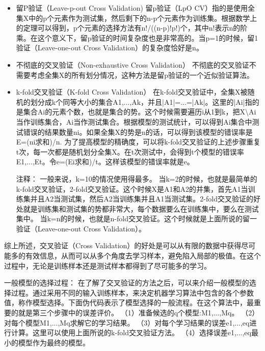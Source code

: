 \documentclass[10pt,a4paper]{ctexbook}
\begin{document}
\begin{itemize}
\item 留P验证（Leave-p-out Cross Validation)
留p验证（LpO CV）指的是使用全集X中的p个元素作为测试集，然后剩下的n-p个元素作为训练集。根据数学上的定理可以得到，p个元素的选择方法有n!/((n-p)!p!)个，其中n!表示n的阶乘。在这个意义下，留p验证的时间复杂度也是非常高的。当p=1的时候，留1验证（Leave-one-out Cross Validation）的复杂度恰好是n。

\item 不彻底的交叉验证（Non-exhaustive Cross Validation）
不彻底的交叉验证不需要考虑全集X的所有划分情况，这种方法是留p验证的一个近似验证算法。

\item k-fold交叉验证（K-fold Cross Validation）
在k-fold交叉验证中，全集X被随机的划分成k个同等大小的集合A1,...,Ak，并且|A1|=...=|Ak|。这里的|Ai|指的是集合Ai的元素个数，也就是集合的势。这个时候需要遍历i从1到k，把X\textbackslash{Ai}当作训练集合，Ai当作测试集合。根据模型的测试统计，可以得到Ai集合中测试错误的结果数量ni。如果全集X的势是n的话，可以得到该模型的错误率是E=(ni求和)/n.
为了提高模型的精确度，可以将k-fold交叉验证的上述步骤重复t次，每一次都是随机划分全集X。在t次测试中，会得到t个模型的错误率E1,...,Et。令e=(Ei求和)/t。这样该模型的错误率就是e。

注释：
一般来说，k=10的情况使用得最多。
当k=2的时候，也就是最简单的k-fold交叉验证，2-fold交叉验证。这个时候X是A1和A2的并集，首先A1当训练集并且A2当测试集，然后A2当训练集并且A1当测试集。2-fold交叉验证的好处就是训练集和测试集的势都非常大，每个数据要么在训练集中，要么在测试集中。
当k=n的时候，也就是n-fold交叉验证。这个时候就是上面所说的留一验证（Leave-one-out Cross Validation）。
\end{itemize}
综上所述，交叉验证（Cross Validation）的好处是可以从有限的数据中获得尽可能多的有效信息，从而可以从多个角度去学习样本，避免陷入局部的极值。在这个过程中，无论是训练样本还是测试样本都得到了尽可能多的学习。

一般模型的选择过程：
在了解了交叉验证的方法之后，可以来介绍一般模型的选择过程。通过采用不同的输入训练样本，来决定机器学习算法中包含的各个参数值，称作模型选择。下面伪代码表示了模型选择的一般流程。在这个算法中，最重要的就是第三个步骤中的误差评价。 
（1）准备候选的q个模型:M1,...,Mq。 
（2）对每个模型M1,...,Mq求解它的学习结果。 
（3）对每个学习结果的误差e1,...,eq进行计算。这里可以使用上面所说的k-fold交叉验证方法。 
（4）选择误差e1,...,eq最小的模型作为最终的模型。
\end{document}
